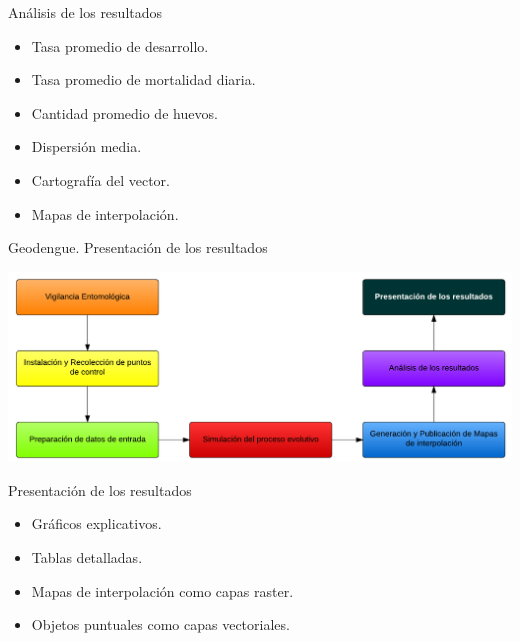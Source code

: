 \begin{frame}[t]{Análisis de los resultados}
\begin{center}
    \begin{itemize}
      \item Tasa promedio de desarrollo.
      \item Tasa promedio de mortalidad diaria.
      \item Cantidad promedio de huevos.
      \item Dispersión media.
      \item Cartografía del vector.
      \item Mapas de interpolación.
    \end{itemize}
\end{center}
\end{frame}

\begin{frame}[c]{Geodengue. Presentación de los resultados}
\begin{center}
    \includegraphics[width=\textwidth]{./graphics/propuesta-resultados.png}
\end{center}
\end{frame}

\begin{frame}[t]{Presentación de los resultados}
  \begin{itemize}
    \item Gráficos explicativos.
    \item Tablas detalladas.
    \item Mapas de interpolación como capas raster.
    \item Objetos puntuales como capas vectoriales.
  \end{itemize}
\end{frame}
